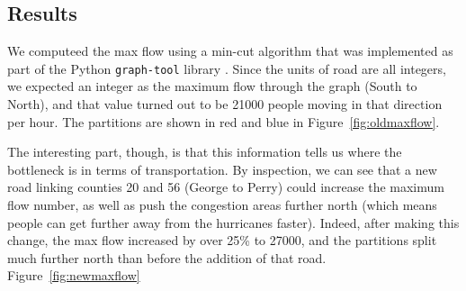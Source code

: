 \documentclass[titlepage]{article}
\begin{document}
  \subsection{Results}
  \par We computeed the max flow using a min-cut algorithm that was implemented as part of the Python \texttt{graph-tool} library \cite{graphtool}. Since the units of road are all integers, we expected an integer as the maximum flow through the graph (South to North), and that value turned out to be 21000 people moving in that direction per hour. The partitions are shown in red and blue in Figure~\ref{fig:oldmaxflow}.
  \par The interesting part, though, is that this information tells us where the bottleneck is in terms of transportation. By inspection, we can see that a new road linking counties 20 and 56 (George to Perry) could increase the maximum flow number, as well as push the congestion areas further north (which means people can get further away from the hurricanes faster). 
  Indeed, after making this change, the max flow increased by over 25\% to 27000, and the partitions split much further north than before the addition of that road. Figure~\ref{fig:newmaxflow}
\end{document}
